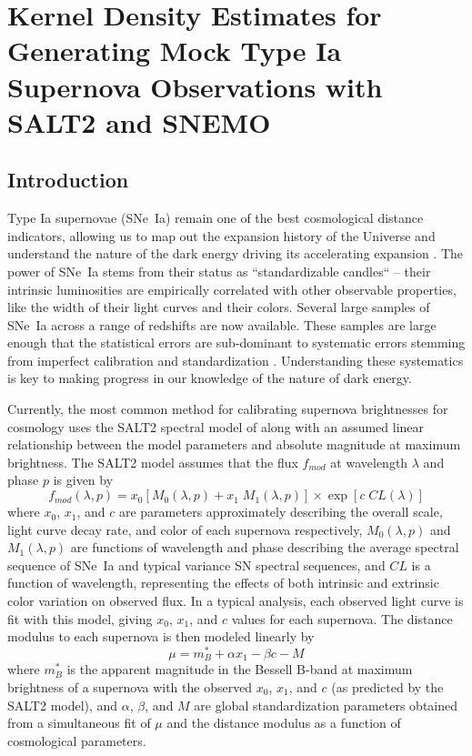 \chapter{Kernel Density Estimates for Generating Mock Type Ia Supernova Observations with SALT2 and SNEMO}
\label{chap:kde}

\section{Introduction}
Type Ia supernovae (SNe~Ia) remain one of the best cosmological distance indicators, allowing us to map out the expansion history of the Universe and understand the nature of the dark energy driving its accelerating expansion \citep{perlmutter_measurements_1999, riess_observational_1998}. The power of SNe~Ia stems from their status as ``standardizable candles`` -- their intrinsic luminosities are empirically correlated with other observable properties, like the width of their light curves and their colors. Several large samples of SNe~Ia across a range of redshifts are now available. These samples are large enough that the statistical errors are sub-dominant to systematic errors stemming from imperfect calibration and standardization \citep{scolnic_complete_2018, abbott_first_2019}. Understanding these systematics is key to making progress in our knowledge of the nature of dark energy.

Currently, the most common method for calibrating supernova brightnesses for cosmology uses the SALT2 spectral model of \cite{guy_salt2_2007} along with an assumed linear relationship between the model parameters and absolute magnitude at maximum brightness. The SALT2 model assumes that the flux $f_{mod}$ at wavelength $\lambda$ and phase $p$ is given by
\begin{equation}
    f_{mod}(\lambda, p) = x_0 \left[M_0(\lambda, p) + x_1\;M_1(\lambda, p)\right] \times \exp\left[c\;CL(\lambda)\right]
    \label{eqn:salt_flux_model}
\end{equation}
where $x_0$, $x_1$, and $c$ are parameters approximately describing the overall scale, light curve decay rate, and color of each supernova respectively, $M_0(\lambda, p)$ and $M_1(\lambda, p)$ are functions of wavelength and phase describing the average spectral sequence of SNe~Ia and typical variance SN spectral sequences, and $CL$ is a function of wavelength, representing the effects of both intrinsic and extrinsic color variation on observed flux. In a typical analysis, each observed light curve is fit with this model, giving $x_0$, $x_1$, and $c$ values for each supernova. The distance modulus to each supernova is then modeled linearly \citep{tripp_two-parameter_1998, tripp_determination_1999} by
\begin{equation}
    \mu = m_B^* + \alpha x_1 -\beta c - M
\end{equation}
where $m_B^*$ is the apparent magnitude in the Bessell B-band at maximum brightness of a supernova with the observed $x_0$, $x_1$, and $c$ (as predicted by the SALT2 model), and $\alpha$, $\beta$, and $M$ are global standardization parameters obtained from a simultaneous fit of $\mu$ and the distance modulus as a function of cosmological parameters.

